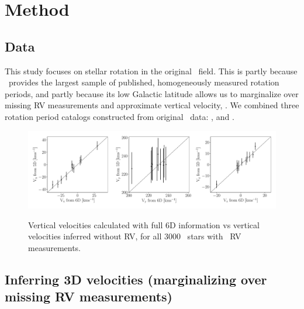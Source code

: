 \section{Method}

\subsection{Data}
\label{sec:data}

This study focuses on stellar rotation in the original \kepler\ field.
This is partly because \kepler\ provides the largest sample of published,
homogeneously measured rotation periods, and partly because its low Galactic
latitude allows us to marginalize over missing RV measurements and approximate
vertical velocity, \vz.
We combined three rotation period catalogs constructed from original \kepler\
data: \citet{mcquillan2014}, \citet{santos2019} and \citet{garcia2014}.

\begin{figure}[ht!]
\caption{Vertical velocities calculated with full 6D information vs vertical
    velocities inferred without RV, for all 3000 \mct\ stars with \gaia\ RV
    measurements.}
  \centering
    \includegraphics[width=1\textwidth]{v_comparison}
\label{fig:existing_rvs}
\end{figure}

\subsection{Inferring 3D velocities (marginalizing over missing RV
measurements)}
\label{sec:velocity_inference}

